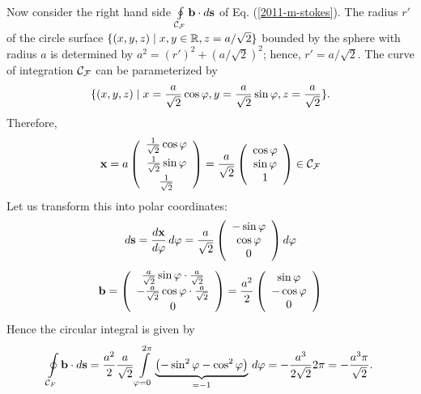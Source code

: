 {\begin{enumerate}
Now consider the right hand side $\oint \limits_{{\cal C}_{\cal F}} {\bf b} \cdot d{\bf s}$
of Eq. (\ref{2011-m-stokes}).
The radius $r'$ of the circle  surface
$\{(x,y,z) \mid x,y \in {\Bbb R} ,z=a/\sqrt{2}\}$ bounded by the sphere with radius $a$
is determined by
$ a^2 =(r')^2 +(a/ \sqrt{2})^2$; hence, $r' =a/\sqrt{2}$.
The curve of integration ${\cal C}_{\cal F}$ can be parameterized by
$$\{(x,y,z) \mid
x={a\over \sqrt{2}} \cos \varphi,
y={a\over \sqrt{2}} \sin \varphi,
z={a\over \sqrt{2}}\}.$$
Therefore,
$$
  {\bf x} = a
  \left(
    \begin{array}{c}
      \frac{1}{\sqrt2}\cos\varphi \\[1ex]
      \frac{1}{\sqrt2}\sin\varphi \\[1ex]
      \frac{1}{\sqrt2}
    \end{array}
  \right)=
  \frac{a}{\sqrt{2}}
  \left(
    \begin{array}{c}
      \cos\varphi \\
      \sin\varphi \\
      1
    \end{array}
  \right)
\in {\cal C}_{\cal F}
$$
Let us transform this into polar coordinates:
$$
  d{\bf s}=\frac{d{\bf x}}{d\varphi} \,d\varphi =
  \frac{a}{\sqrt{2}}
  \left(
    \begin{array}{c}
      -\sin\varphi \\
      \cos\varphi \\
      0
    \end{array}
  \right) d\varphi
$$
$$
  {\bf b}=
  \left(
    \begin{array}{c}
      \frac{a}{\sqrt{2}}\sin\varphi\cdot\frac{a}{\sqrt{2}} \\
      -\frac{a}{\sqrt{2}}\cos\varphi\cdot\frac{a}{\sqrt{2}} \\
      0
    \end{array}
  \right)=
  \frac{a^2}{2}
  \left(
    \begin{array}{c}
      \sin\varphi \\
      -\cos\varphi \\
      0
    \end{array}
  \right)
$$
Hence the circular integral is given by
$$
  \oint \limits_{{\cal C}_F} {\bf b} \cdot d{\bf s}=
  \frac{a^2}{2}\frac{a}{\sqrt{2}}
  \int \limits_{\varphi=0}^{2 \pi}
  \underbrace
    {\left(-\sin^2\varphi-\cos^2\varphi\right)}
  _{=-1}
  \, d\varphi =
  -\frac{a^3}{2\sqrt{2}}2 \pi=-\frac{a^3 \pi}{\sqrt{2}}
.
$$




\end{enumerate}

\eexample
}

